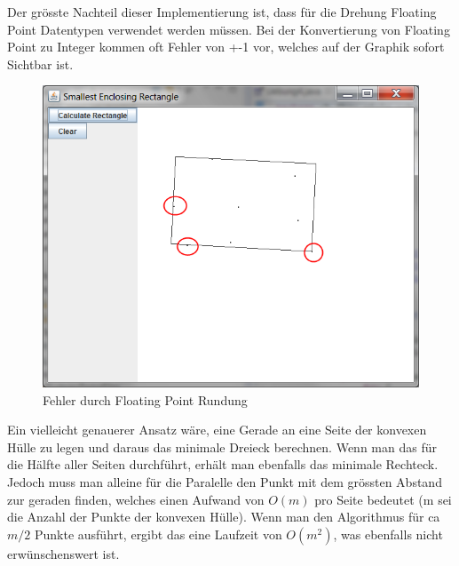 \documentclass[10pt]{article}
\begin{document}
Der grösste Nachteil dieser Implementierung ist, dass für die Drehung Floating Point Datentypen verwendet werden müssen. Bei der Konvertierung von Floating Point zu Integer kommen oft Fehler von +-1 vor, welches auf der Graphik sofort Sichtbar ist. 

\begin{figure} [h!]

\includegraphics[scale= 0.75]{screenshot.png}
\caption{Fehler durch Floating Point Rundung}
\end{figure}

Ein vielleicht genauerer Ansatz wäre, eine Gerade an eine Seite der konvexen Hülle zu legen und daraus das minimale Dreieck berechnen. Wenn man das für die Hälfte aller Seiten durchführt, erhält man ebenfalls das minimale Rechteck. Jedoch muss man alleine für die Paralelle den Punkt mit dem grössten Abstand zur geraden finden, welches einen Aufwand von $O(m)$ pro Seite bedeutet (m sei die Anzahl der Punkte der konvexen Hülle). Wenn man den Algorithmus für ca $m/2$ Punkte ausführt, ergibt das eine Laufzeit von $O(m^2)$, was ebenfalls nicht erwünschenswert ist.
\end{document}
